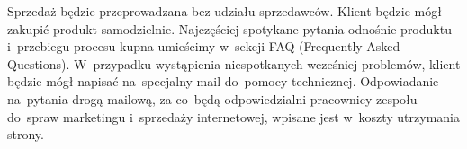 \documentclass[12pt]{article}
\begin{document}
\begin{table}[h!]
 \begin{center}
 \caption{Prognoza sprzedaży na~pierwsze 4~lata}
 \label{table:sales}
 \end{center}
\end{table}

Sprzedaż będzie przeprowadzana bez udziału sprzedawców.
Klient będzie mógł zakupić produkt samodzielnie.
Najczęściej spotykane pytania odnośnie produktu i~przebiegu procesu kupna umieścimy w~sekcji FAQ (Frequently Asked Questions).
W~przypadku wystąpienia niespotkanych wcześniej problemów, klient będzie mógł napisać na~specjalny mail do~pomocy technicznej.
Odpowiadanie na~pytania drogą mailową, za co~będą odpowiedzialni pracownicy zespołu do~spraw marketingu i~sprzedaży internetowej, wpisane jest w~koszty utrzymania strony.
\end{document}
